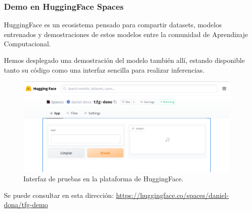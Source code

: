 \subsubsection{Demo en HuggingFace Spaces}

HuggingFace es un ecosistema pensado para compartir datasets, modelos entrenados y demostraciones de estos modelos entre la comunidad de Aprendizaje Computacional.

Hemos desplegado una demostración del modelo también allí, estando disponible tanto su código como una interfaz sencilla para realizar inferencias.

\begin{figure}[H]
\centering
\includegraphics[width=14cm]{8_entregables_img/entrega_hf_0.png}
\caption{Interfaz de pruebas en la plataforma de HuggingFace.}
\label{fig:figure1}
\end{figure}

Se puede consultar en esta dirección: \url{https://huggingface.co/spaces/daniel-dona/tfg-demo}

\newpage 